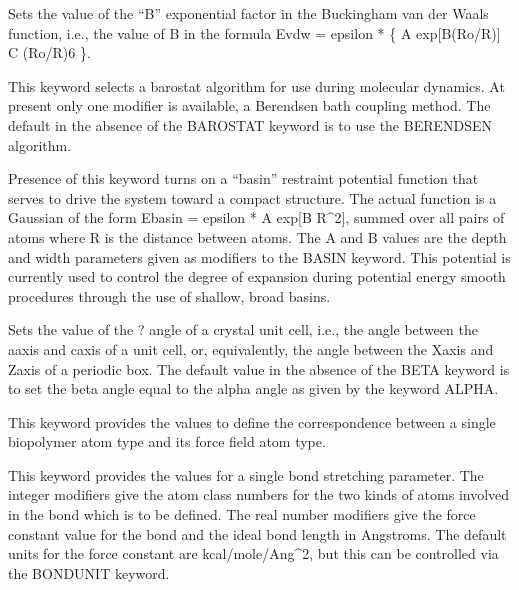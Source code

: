 \documentclass[letterpaper,11pt,english]{sphinxmanual}
\begin{document}
  Sets the value of the “B” exponential factor in the Buckingham van der Waals function, i.e., the value of B in the formula Evdw = epsilon * \{ A exp{[}\sphinxhyphen{}B(Ro/R){]} \sphinxhyphen{} C (Ro/R)6 \}.

  This keyword selects a barostat algorithm for use during molecular dynamics. At present only one modifier is available, a Berendsen bath coupling method. The default in the absence of the BAROSTAT keyword is to use the BERENDSEN algorithm.

  Presence of this keyword turns on a “basin” restraint potential function that serves to drive the system toward a compact structure. The actual function is a Gaussian of the form Ebasin = epsilon * A exp{[}\sphinxhyphen{}B R\textasciicircum{}2{]}, summed over all pairs of atoms where R is the distance between atoms. The A and B values are the depth and width parameters given as modifiers to the BASIN keyword. This potential is currently used to control the degree of expansion during potential energy smooth procedures through the use of shallow, broad basins.



  Sets the value of the ? angle of a crystal unit cell, i.e., the angle between the a\sphinxhyphen{}axis and c\sphinxhyphen{}axis of a unit cell, or, equivalently, the angle between the X\sphinxhyphen{}axis and Z\sphinxhyphen{}axis of a periodic box. The default value in the absence of the BETA keyword is to set the beta angle equal to the alpha angle as given by the keyword ALPHA.

  This keyword provides the values to define the correspondence between a single biopolymer atom type and its force field atom type.

  This keyword provides the values for a single bond stretching parameter. The integer modifiers give the atom class numbers for the two kinds of atoms involved in the bond which is to be defined. The real number modifiers give the force constant value for the bond and the ideal bond length in Angstroms. The default units for the force constant are kcal/mole/Ang\textasciicircum{}2, but this can be controlled via the BONDUNIT keyword.
\end{document}
